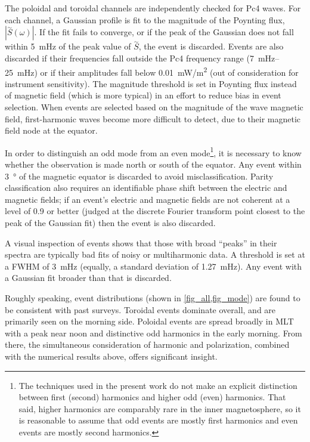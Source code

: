 \documentclass[draft,linenumbers]{agujournal}
\begin{document}
The poloidal and toroidal channels are independently checked for Pc4 waves. For each channel, a Gaussian profile is fit to the magnitude of the Poynting flux, $|\overset{\sim}{S}\left(\omega\right)|$. If the fit fails to converge, or if the peak of the Gaussian does not fall within \SI{5}{\mHz} of the peak value of $\overset{\sim}{S}$, the event is discarded. Events are also discarded if their frequencies fall outside the Pc4 frequency range (\SIrange{7}{25}{\mHz}) or if their amplitudes fall below \SI{0.01}{\mW/\m\squared} (out of consideration for instrument sensitivity). The magnitude threshold is set in Poynting flux instead of magnetic field (which is more typical) in an effort to reduce bias in event selection. When events are selected based on the magnitude of the wave magnetic field, first-harmonic waves become more difficult to detect, due to their magnetic field node at the equator\citep{dai_2015}.

In order to distinguish an odd mode from an even mode\footnote{
The techniques used in the present work do not make an explicit distinction between first (second) harmonics and higher odd (even) harmonics. That said, higher harmonics are comparably rare in the inner magnetosphere, so it is reasonable to assume that odd events are mostly first harmonics and even events are mostly second harmonics.}, it is necessary to know whether the observation is made north or south of the equator. Any event within \SI{3}{\degree} of the magnetic equator is discarded to avoid misclassification. Parity classification also requires an identifiable phase shift between the electric and magnetic fields; if an event's electric and magnetic fields are not coherent at a level of 0.9 or better (judged at the discrete Fourier transform point closest to the peak of the Gaussian fit) then the event is also discarded.

A visual inspection of events shows that those with broad ``peaks'' in their spectra are typically bad fits of noisy or multiharmonic data. A threshold is set at a FWHM of \SI{3}{\mHz} (equally, a standard deviation of \SI{1.27}{\mHz}). Any event with a Gaussian fit broader than that is discarded.

Roughly speaking, event distributions (shown in \cref{fig_all,fig_mode}) are found to be consistent with past surveys. Toroidal events dominate overall, and are primarily seen on the morning side. Poloidal events are spread broadly in MLT with a peak near noon and distinctive odd harmonics in the early morning. From there, the simultaneous consideration of harmonic and polarization, combined with the numerical results above, offers significant insight.
\end{document}
